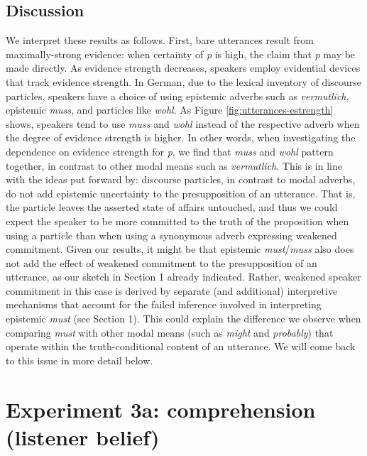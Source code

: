 \documentclass[11pt]{article}
\newcommand{\figref}[1]{Figure \ref{#1}}
\begin{document}
\subsection{Discussion}
We interpret these results as follows. First, bare utterances result from maximally-strong evidence: when certainty of \emph{p} is high, the claim that \emph{p} may be made directly. As evidence strength decreases, speakers employ evidential devices that track evidence strength. In German, due to the lexical inventory of discourse particles, speakers have a choice of using epistemic adverbs such as \emph{vermutlich}, epistemic \emph{muss}, and particles like \emph{wohl}. As \figref{fig:utterances-estrength} shows, speakers tend to use \emph{muss} and \emph{wohl} instead of the respective adverb when the degree of evidence strength is higher. In other words, when investigating the dependence on evidence strength for \emph{p}, we find that \emph{muss} and \emph{wohl} pattern together, in contrast to other modal means such as \emph{vermutlich}. This is in line with the ideas put forward by\cite{Zimmermann2004, Zimmermann2008}: discourse particles, in contrast to modal adverbs, do not add epistemic uncertainty to the presupposition of an utterance. That is, the particle leaves the asserted state of affairs untouched, and thus we could expect the speaker to be more committed to the truth of the proposition when using a particle than when using a synonymous adverb expressing weakened commitment. Given our results, it might be that epistemic \emph{must}/\emph{muss} also does not add the effect of weakened commitment to the presupposition of an utterance, as our sketch in Section 1 already indicated. Rather, weakened speaker commitment in this case is derived by separate (and additional) interpretive mechanisms that account for the failed inference involved in interpreting epistemic \emph{must} (see Section 1). This could explain the difference we observe when comparing \emph{must} with other modal means (such as \emph{might} and \emph{probably}) that operate within the truth-conditional content of an utterance. We will come back to this issue in more detail below.



\section{Experiment 3a: comprehension (listener belief)}
\end{document}
